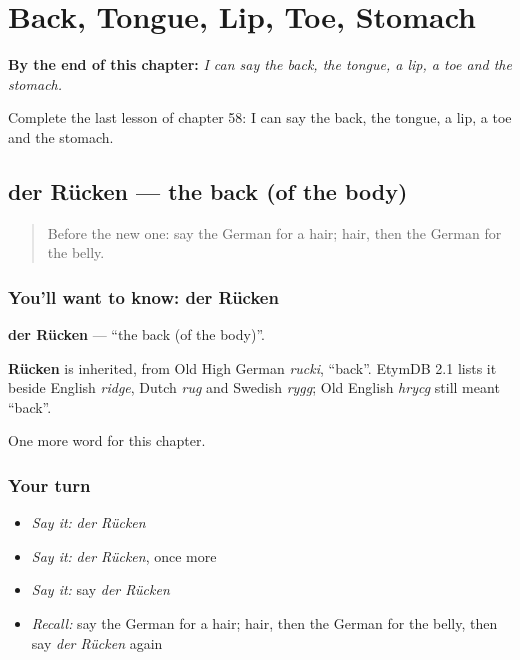 
\chapter{Back, Tongue, Lip, Toe, Stomach}
\label{ch:ge-back-tongue-lip-toe-stomach}

\begin{chapteropening}
\textbf{By the end of this chapter:} \emph{I can say the back, the tongue, a lip, a toe and the stomach.}

Complete the last lesson of chapter 58: I can say the back, the tongue, a lip, a toe and the stomach.
\end{chapteropening}

\section[der Rücken]{der Rücken — the back (of the body)}

\label{lesson:GE-C58-ruecken}



\begin{quote}
Before the new one: say the German for a hair; hair, then the German for the belly.
\end{quote}

\subsection*{You'll want to know: der Rücken}
\textbf{der Rücken} — \textquotedblleft{}the back (of the body)\textquotedblright{}.

\begin{cousinweb}
\textbf{Rücken} is inherited, from Old High German \emph{rucki}, \textquotedblleft{}back\textquotedblright{}. EtymDB 2.1 lists it beside English \emph{ridge}, Dutch \emph{rug} and Swedish \emph{rygg}; Old English \emph{hrycg} still meant \textquotedblleft{}back\textquotedblright{}.
\end{cousinweb}

\begin{grammarlens}[title={What you've built}]
One more word for this chapter.
\end{grammarlens}

\subsection*{Your turn}
\begin{itemize}
\raggedright
  \item \emph{Say it:} \emph{der Rücken}
  \item \emph{Say it:} \emph{der Rücken}, once more
  \item \emph{Say it:} say \emph{der Rücken}
  \item \emph{Recall:} say the German for a hair; hair, then the German for the belly, then say \emph{der Rücken} again
\end{itemize}

